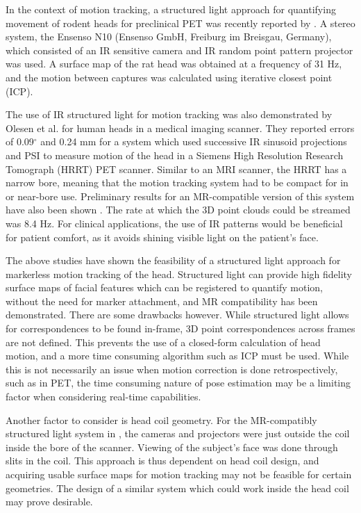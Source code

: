 \documentclass[class=article, crop=false]{standalone}
\begin{document}
\par
In the context of motion tracking, a structured light approach for quantifying movement of rodent heads for preclinical PET was recently reported by \cite{Miranda2017}. A stereo system, the Ensenso N10 (Ensenso GmbH, Freiburg im Breisgau, Germany), which consisted of an IR sensitive camera and IR random point pattern projector was used. A surface map of the rat head was obtained at a frequency of 31 Hz, and the motion between captures was calculated using iterative closest point (ICP).
\par 
The use of IR structured light for motion tracking was also demonstrated by Olesen et al. \parencite*{Olesen2012} for human heads in a medical imaging scanner. They reported errors of 0.09$^{\circ}$ and 0.24 mm for a system which used successive IR sinusoid projections and PSI to measure motion of the head in a Siemens High Resolution Research Tomograph (HRRT) PET scanner. Similar to an MRI scanner, the HRRT has a narrow bore, meaning that the motion tracking system had to be compact for in or near-bore use. Preliminary results for an MR-compatible version of this system have also been shown \parencite{Olesen2015a}. The rate at which the 3D point clouds could be streamed was 8.4 Hz. For clinical applications, the use of IR patterns would be beneficial for patient comfort, as it avoids shining visible light on the patient's face.
\par
The above studies have shown the feasibility of a structured light approach for markerless motion tracking of the head. Structured light can provide high fidelity surface maps of facial features which can be registered to quantify motion, without the need for marker attachment, and MR compatibility has been demonstrated. There are some drawbacks however. While structured light allows for correspondences to be found in-frame, 3D point correspondences across frames are not defined. This prevents the use of a closed-form calculation of head motion, and a more time consuming algorithm such as ICP must be used. While this is not necessarily an issue when motion correction is done retrospectively, such as in PET, the time consuming nature of pose estimation may be a limiting factor when considering real-time capabilities.
\par
Another factor to consider is head coil geometry. For the MR-compatibly structured light system in \cite{Olesen2015a}, the cameras and projectors were just outside the coil inside the bore of the scanner. Viewing of the subject's face was done through slits in the coil. This approach is thus dependent on head coil design, and acquiring usable surface maps for motion tracking may not be feasible for certain geometries. The design of a similar system which could work inside the head coil may prove desirable.
\end{document}
